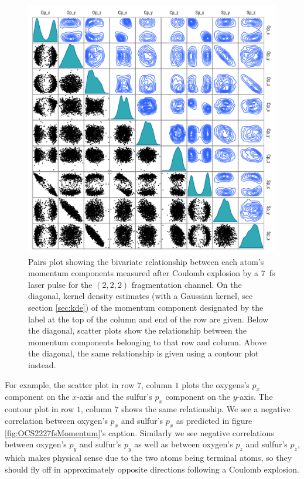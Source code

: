 \begin{figure}
  \centering
  \includegraphics[width=\textwidth]{Plots/OCS2227fsMomentumPairsPlot.png}
  \caption[Pairs plot showing the bivariate relationship between each atom's momentum components measured after Coulomb explosion by a \SI{7}{\fs} laser pulse for the $(2,2,2)$ fragmentation channel.]
  {Pairs plot showing the bivariate relationship between each atom's momentum components measured after Coulomb explosion by a \SI{7}{\fs} laser pulse for the $(2,2,2)$ fragmentation channel. On the diagonal, kernel density estimates (with a Gaussian kernel, see section \ref{sec:kde}) of the momentum component designated by the label at the top of the column and end of the row are given. Below the diagonal, scatter plots show the relationship between the momentum components belonging to that row and column. Above the diagonal, the same relationship is given using a contour plot instead.}
  \label{fig:OCS2227fsMomentumPairPlots}
\end{figure}

For example, the scatter plot in row $7$, column $1$ plots the oxygens's $p_x$ component on the $x$-axis and the sulfur's $p_x$ component on the $y$-axis. The contour plot in row $1$, column $7$ shows the same relationship. We see a negative correlation between oxygen's $p_x$ and sulfur's $p_x$ as predicted in figure \ref{fig:OCS2227fsMomentum}'s caption. Similarly we see negative correlations between oxygen's $p_y$ and sulfur's $p_y$ as well as between oxygen's $p_z$ and sulfur's $p_z$, which makes physical sense due to the two atoms being terminal atoms, so they should fly off in approximately opposite directions following a Coulomb explosion.

